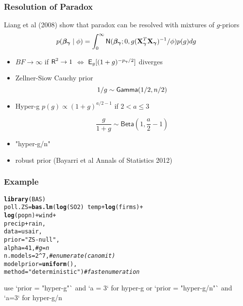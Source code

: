 \documentclass[handout]{beamer}\usepackage[]{graphicx}\usepackage[]{color}
\makeatletter
\newcommand{\hlnum}[1]{\textcolor[rgb]{0.686,0.059,0.569}{#1}}%
\newcommand{\hlstr}[1]{\textcolor[rgb]{0.192,0.494,0.8}{#1}}%
\newcommand{\hlcom}[1]{\textcolor[rgb]{0.678,0.584,0.686}{\textit{#1}}}%
\newcommand{\hlopt}[1]{\textcolor[rgb]{0,0,0}{#1}}%
\newcommand{\hlstd}[1]{\textcolor[rgb]{0.345,0.345,0.345}{#1}}%
\newcommand{\hlkwb}[1]{\textcolor[rgb]{0.69,0.353,0.396}{#1}}%
\newcommand{\hlkwc}[1]{\textcolor[rgb]{0.333,0.667,0.333}{#1}}%
\newcommand{\hlkwd}[1]{\textcolor[rgb]{0.737,0.353,0.396}{\textbf{#1}}}%
\newenvironment{kframe}{%
 \def\at@end@of@kframe{}%
 \ifinner\ifhmode%
  \def\at@end@of@kframe{\end{minipage}}%
  \begin{minipage}{\columnwidth}%
 \fi\fi%
 \def\FrameCommand##1{\hskip\@totalleftmargin \hskip-\fboxsep
 \colorbox{shadecolor}{##1}\hskip-\fboxsep
     \hskip-\linewidth \hskip-\@totalleftmargin \hskip\columnwidth}%
 \MakeFramed {\advance\hsize-\width
   \@totalleftmargin\z@ \linewidth\hsize
   \@setminipage}}%
 {\par\unskip\endMakeFramed%
 \at@end@of@kframe}
\newenvironment{knitrout}{}{} %
\makeatother
\begin{document}
\begin{frame} \frametitle{Resolution of Paradox}

Liang et al (2008) show that paradox can be resolved with mixtures of $g$-priors
$$p(\boldsymbol{\beta_\gamma} \mid \phi) = \int_0^{\infty} \textsf{N}(\boldsymbol{\beta_\gamma}; 0, g (\mathbf{X}_{\boldsymbol{\gamma}}^T\mathbf{X}_{\boldsymbol{\gamma}})^{-1}/\phi) p(g) dg$$
\pause

\begin{itemize}
\item  $BF \to \infty$ if $\textsf{R}^2 \to 1$  $\Leftrightarrow$ $\textsf{E}_g[(1 +
g)^{-p_{\boldsymbol{\gamma}}/2}]$ diverges \pause
\item Zellner-Siow Cauchy prior
$$ 1/g \sim \textsf{Gamma}(1/2, n/2)$$ \pause

\item Hyper-g   $p(g) \propto (1 +g )^{a/2 - 1}$ if $2 < a \le 3$

$$\frac{g}{1+g} \sim \textsf{Beta}(1, \frac{a}{2} - 1)$$
\pause
\item "hyper-g/n"
\pause
\item  robust prior (Bayarri et al Annals of Statistics 2012)
\end{itemize}

\end{frame}


\begin{frame}[fragile] \frametitle{Example}


\begin{knitrout}
\color{fgcolor}\begin{kframe}
\begin{alltt}
\hlkwd{library}\hlstd{(BAS)}
\hlstd{poll.ZS} \hlkwb{=} \hlkwd{bas.lm}\hlstd{(}\hlkwd{log}\hlstd{(SO2)} \hlopt{~} \hlstd{temp} \hlopt{+} \hlkwd{log}\hlstd{(firms)} \hlopt{+}
                             \hlkwd{log}\hlstd{(popn)} \hlopt{+} \hlstd{wind} \hlopt{+}
                             \hlstd{precip}\hlopt{+} \hlstd{rain,}
                  \hlkwc{data}\hlstd{=usair,}
                  \hlkwc{prior}\hlstd{=}\hlstr{"ZS-null"}\hlstd{,}
                  \hlkwc{alpha}\hlstd{=}\hlnum{41}\hlstd{,}    \hlcom{# g = n}
                  \hlkwc{n.models}\hlstd{=}\hlnum{2}\hlopt{^}\hlnum{7}\hlstd{,}\hlcom{# enumerate (can omit)}
                  \hlkwc{modelprior}\hlstd{=}\hlkwd{uniform}\hlstd{(),}
                  \hlkwc{method}\hlstd{=}\hlstr{"deterministic"}\hlstd{)}   \hlcom{# fast enumeration}
\end{alltt}
\end{kframe}
\end{knitrout}
 use `prior = "hyper-g"` and `a = 3` for hyper-g or `prior = "hyper-g/n"` and `a=3` for hyper-g/n
\end{frame}
\end{document}
